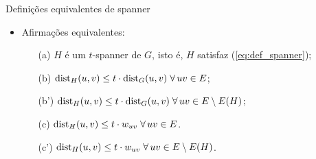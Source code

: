 \documentclass[dvipsnames]{beamer}
\newcommand{\dist}{{\rm dist}}
\begin{document}
\begin{frame}{Definições equivalentes de spanner \hyperlink{span}{\beamergotobutton{$\leftarrow$}}}
  \hypertarget{defspan}{}
  \begin{itemize}
    \item Afirmações equivalentes:
      \begin{itemize}
        \item[{\rm (a)}] $H$ é um $t$-spanner de $G$, isto é, $H$ satisfaz (\ref{eq:def_spanner});
        \item[{\rm (b)}] $\dist_{H}(u,v) \le t \cdot \dist_{G}(u,v) \;\forall\,uv \in E$;
        \item[{\rm (b')}] $\dist_{H}(u,v) \le t \cdot \dist_{G}(u,v) \;\forall\,uv \in E \setminus E(H)$;
        \item[{\rm (c)}] $\dist_{H}(u,v) \le t \cdot w_{uv} \;\forall\,uv \in E$.
        \item[{\rm (c')}] $\dist_{H}(u,v) \le t \cdot w_{uv} \;\forall\,uv \in E \setminus E(H)$.
        \end{itemize}
    \end{itemize}
\end{frame}
\end{document}
